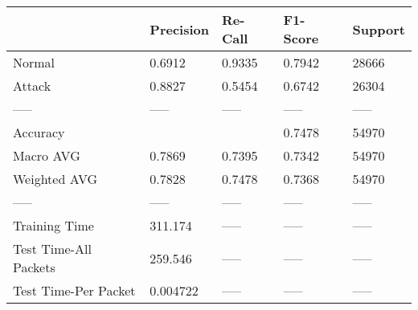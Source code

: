 \begin{tabular}{lllll}
\toprule
{} & Precision & Re-Call & F1-Score & Support \\
\midrule
Normal                &    0.6912 &  0.9335 &   0.7942 &   28666 \\
Attack                &    0.8827 &  0.5454 &   0.6742 &   26304 \\
-----                 &     ----- &   ----- &    ----- &   ----- \\
Accuracy              &           &         &   0.7478 &   54970 \\
Macro AVG             &    0.7869 &  0.7395 &   0.7342 &   54970 \\
Weighted AVG          &    0.7828 &  0.7478 &   0.7368 &   54970 \\
-----                 &     ----- &   ----- &    ----- &   ----- \\
Training Time         &   311.174 &   ----- &    ----- &   ----- \\
Test Time-All Packets &   259.546 &   ----- &    ----- &   ----- \\
Test Time-Per Packet  &  0.004722 &   ----- &    ----- &   ----- \\
\bottomrule
\end{tabular}
